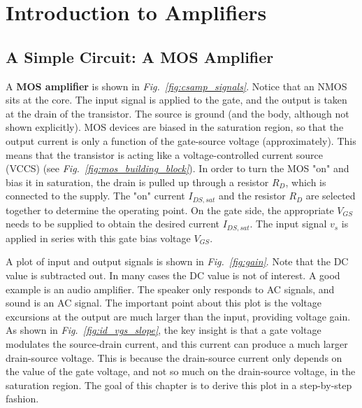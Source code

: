 \section{Introduction to Amplifiers}
\subsection{A Simple Circuit: A MOS Amplifier}
A \textbf{MOS amplifier} is shown in \emph{Fig.~\ref{fig:csamp_signals}}.  Notice that an NMOS sits at the core.  The input signal is applied to the gate, and the output is taken at the drain of the transistor.  The source is ground (and the body, although not shown explicitly).  MOS devices are biased in the saturation region, so that the output current is only a function of the gate-source voltage (approximately).  This means that the transistor is acting like a voltage-controlled current source (VCCS) (see \emph{Fig.~\ref{fig:mos_building_block}}).  In order to turn the MOS "on" and bias it in saturation, the drain is pulled up through a resistor $R_D$, which is connected to the supply.  The "on" current $I_{DS,sat}$ and the resistor $R_D$ are selected together to determine the operating point.  On the gate side, the appropriate $V_{GS}$ needs to be supplied to obtain the desired current $I_{DS,sat}$.  The input signal $v_{s}$ is applied in series with this gate bias voltage $V_{GS}$.

A plot of input and output signals is shown in \emph{Fig.~\ref{fig:gain}}.  Note that the DC value is subtracted out.  In many cases the DC value is not of interest.  A good example is an audio amplifier.  The speaker only responds to AC signals, and sound is an AC signal.  The important point about this plot is the voltage excursions at the output are much larger than the input, providing voltage gain.  As shown in \emph{Fig.~\ref{fig:id_vgs_slope}}, the key insight is that a gate voltage modulates the source-drain current, and this current can produce a much larger drain-source voltage.  This is because the drain-source current only depends on the value of the gate voltage, and not so much on the drain-source voltage, in the saturation region. The goal of this chapter is to derive this plot in a step-by-step fashion.
